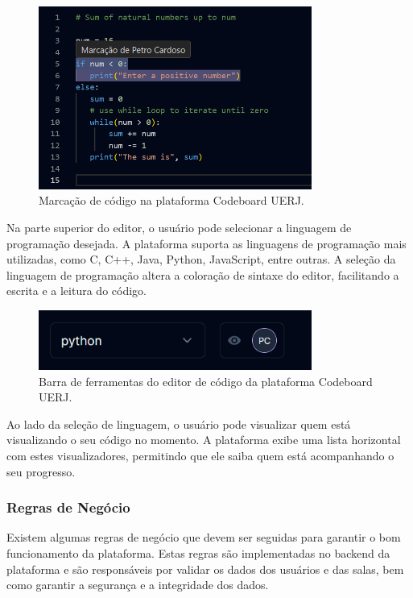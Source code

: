 \begin{figure}[H]
    \centering
    \includegraphics[width=0.8\textwidth]{assets/codeboard/code-editor-user-highlight.png}
    \caption{Marcação de código na plataforma Codeboard UERJ.}
    \label{fig:code-editor-user-highlight}
\end{figure}

Na parte superior do editor, o usuário pode selecionar a linguagem de programação desejada. A plataforma suporta as linguagens de programação mais utilizadas, como C, C++, Java, Python, JavaScript, entre outras. A seleção da linguagem de programação altera a coloração de sintaxe do editor, facilitando a escrita e a leitura do código.

\begin{figure}[H]
    \centering
    \includegraphics[width=0.8\textwidth]{assets/codeboard/code-editor-toolbar.png}
    \caption{Barra de ferramentas do editor de código da plataforma Codeboard UERJ.}
    \label{fig:code-editor-toolbar}
\end{figure}

Ao lado da seleção de linguagem, o usuário pode visualizar quem está visualizando o seu código no momento. A plataforma exibe uma lista horizontal com estes visualizadores, permitindo que ele saiba quem está acompanhando o seu progresso.


\subsubsection{Regras de Negócio}

Existem algumas regras de negócio que devem ser seguidas para garantir o bom funcionamento da plataforma. Estas regras são implementadas no backend da plataforma e são responsáveis por validar os dados dos usuários e das salas, bem como garantir a segurança e a integridade dos dados.

